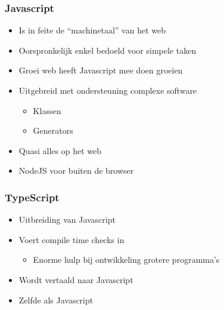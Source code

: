 \begin{frame}
  \frametitle{Javascript}
  \begin{itemize}
    \item Is in feite de ``machinetaal'' van het web
    \item Oorspronkelijk enkel bedoeld voor simpele taken
    \item Groei web heeft Javascript mee doen groeien
    \item Uitgebreid met ondersteuning complexe software
          \begin{itemize}
            \item Klassen
            \item Generators
          \end{itemize}
  \end{itemize}
  \vskip4mm
  \begin{itemize}
    \item Quasi alles op het web
    \item NodeJS voor buiten de browser
  \end{itemize}
\end{frame}

\begin{frame}
  \frametitle{TypeScript}
  \begin{itemize}
    \item Uitbreiding van Javascript
    \item Voert compile time checks in
          \begin{itemize}
            \item Enorme hulp bij ontwikkeling grotere programma's
          \end{itemize}
    \item Wordt vertaald naar Javascript
  \end{itemize}
  \vskip4mm
  \begin{itemize}
    \item Zelfde als Javascript
  \end{itemize}
\end{frame}


